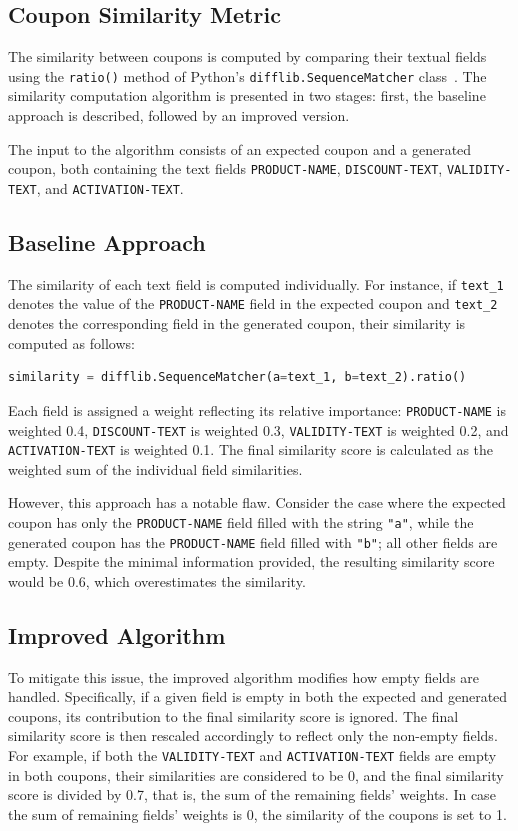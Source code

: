 \documentclass[licencjacka,en]{pracamgr}
\begin{document}
\begin{appendices}
\chapter{Coupon Similarity Metric} \label{app:coupon_sim}
The similarity between coupons is computed by comparing their textual fields using the \texttt{ratio()} method of Python's \texttt{difflib.SequenceMatcher} class~\cite{python-difflib}. The similarity computation algorithm is presented in two stages: first, the baseline approach is described, followed by an improved version. 

The input to the algorithm consists of an expected coupon and a generated coupon, both containing the text fields \texttt{PRODUCT-NAME}, \texttt{DISCOUNT-TEXT}, \texttt{VALIDITY-TEXT}, and \texttt{ACTIVATION-TEXT}.

\section{Baseline Approach}
The similarity of each text field is computed individually. For instance, if \texttt{text\_1} denotes the value of the \texttt{PRODUCT-NAME} field in the expected coupon and \texttt{text\_2} denotes the corresponding field in the generated coupon, their similarity is computed as follows:

\begin{lstlisting}[language=Python]
similarity = difflib.SequenceMatcher(a=text_1, b=text_2).ratio()
\end{lstlisting}

Each field is assigned a weight reflecting its relative importance: \texttt{PRODUCT-NAME} is weighted 0.4, \texttt{DISCOUNT-TEXT} is weighted 0.3, \texttt{VALIDITY-TEXT} is weighted 0.2, and \texttt{ACTIVATION-TEXT} is weighted 0.1. The final similarity score is calculated as the weighted sum of the individual field similarities.

However, this approach has a notable flaw. Consider the case where the expected coupon has only the \texttt{PRODUCT-NAME} field filled with the string \texttt{"a"}, while the generated coupon has the \texttt{PRODUCT-NAME} field filled with \texttt{"b"}; all other fields are empty. Despite the minimal information provided, the resulting similarity score would be 0.6, which overestimates the similarity.

\section{Improved Algorithm}
To mitigate this issue, the improved algorithm modifies how empty fields are handled. Specifically, if a given field is empty in both the expected and generated coupons, its contribution to the final similarity score is ignored. The final similarity score is then rescaled accordingly to reflect only the non-empty fields. For example, if both the \texttt{VALIDITY-TEXT} and \texttt{ACTIVATION-TEXT} fields are empty in both coupons, their similarities are considered to be 0, and the final similarity score is divided by 0.7, that is, the sum of the remaining fields' weights. In case the sum of remaining fields' weights is 0, the similarity of the coupons is set to 1.


\end{appendices}
\end{document}
